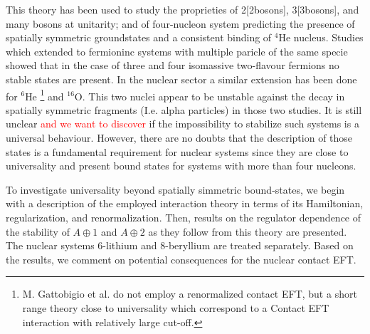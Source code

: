 \documentclass[preprint,12pt]{elsarticle}
\newcommand{\red}[1]{\textcolor{red}{#1}}
\newcommand{\wrt}{\textit{wrt.}~}
\begin{document}
This theory has been used to study the proprieties of 2[2bosons], 3[3bosons], and many\cite{manybosons} bosons at unitarity; and of four-nucleon system \cite{Barnea:2013uqa} predicting the presence of spatially symmetric groundstates and a consistent binding of $^4$He nucleus.
Studies which extended to fermioninc systems with multiple paricle of the same specie showed that in the case of three\cite{Kartavtsev_2007} and four\cite{petrov_dimerov, Petrov:2005zz,PhysRevA.92.053624} isomassive two-flavour fermions no stable states are present.
In the nuclear sector a similar extension has been done for $^{6}$He\cite{Gattobigio:2019omi}
\footnote{M. Gattobigio et al. do not employ a renormalized contact EFT, but a short range theory close to universality which correspond to a Contact EFT interaction with relatively large cut-off.}
and $^{16}$O\cite{Contessi:2017rww}.
This two nuclei appear to be unstable against the decay in spatially symmetric fragments (I.e. alpha particles) in those two studies.
It is still unclear \red{and we want to discover} if the impossibility to stabilize such systems is a universal behaviour.
However, there are no doubts that the description of those states is a fundamental requirement for nuclear systems since they are close to universality and present bound states for systems with more than four nucleons.

To investigate universality beyond spatially simmetric bound-states, we begin with a description of the employed interaction theory in terms of its Hamiltonian, regularization, and renormalization. 
Then, results on the regulator dependence of the stability of $A\oplus 1$ and $A\oplus 2$ as they follow from this theory are presented.
The nuclear systems 6-lithium and 8-beryllium are treated separately.
Based on the results, we comment on potential consequences for the nuclear contact EFT.



\newpage
\end{document}
